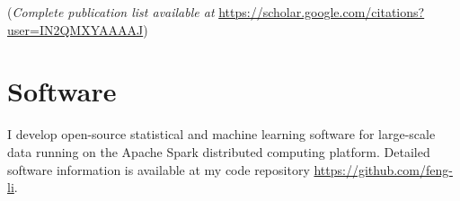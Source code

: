 \documentclass[twoside,a4paper]{article}
\begin{document}
(\emph{Complete publication list available at}
  \url{https://scholar.google.com/citations?user=IN2QMXYAAAAJ})

\begin{refsection}
\nocite{HuangY2024LocalInformation}
\nocite{RenY2023InfiniteForecast}
\nocite{ZhangG2023ProbabilisticForecast}
\nocite{LiF2024ForecasterReview}
\nocite{LiL2023ForecastingLarge}
\nocite{ZhangB2023OptimalReconciliation}
\nocite{LiL2023FeaturebasedIntermittent}
\nocite{WangX2023ForecastCombinations}
\nocite{PanR2022NoteDistributed}
\nocite{LiL2023BayesianForecast}
\nocite{WangZ2022EscalatorAccident}
\nocite{WangX2023DistributedARIMA}
\nocite{AndererM2022HierarchicalForecasting}
\nocite{JanewayMG2021ClinicalDiagnostic}
\nocite{PetropoulosF2022ForecastingTheory}
\nocite{KangY2022ForecastForecasts}
\nocite{TalagalaTS2022FFORMPPFeaturebased}
\nocite{ZhuX2021LeastSquareApproximation}
\nocite{WangX2022UncertaintyEstimation}
\nocite{KangY2021DejaVu}
\nocite{HaoC2020BilinearReduced}
\nocite{LiX2020ForecastingTime}
\nocite{KangY2020GRATISGeneRAting}
\nocite{kang2020statcompcn}
\nocite{kang2020fppcn}
\nocite{KalesanB2020IntersectionsFirearm}
\nocite{BaileyHM2019ChangesPatterns}
\nocite{LiF2019CreditRisk}
\nocite{LiF2018ImprovingForecasting}
\nocite{PinoEC2018CohortProfile}
\nocite{li2016distributedcn}
\nocite{LiF2013BayesianModeling}
\nocite{LiF2013EfficientBayesian}
\nocite{LiF2011ModellingConditional}
\nocite{LiF2010FlexibleModeling}

\printbibliography[heading=none]
\end{refsection}

\newpage
\section{Software}
I develop open-source statistical and machine learning software for large-scale data running on the Apache Spark distributed computing platform. Detailed software information is available at my code repository \url{https://github.com/feng-li}.
\end{document}
